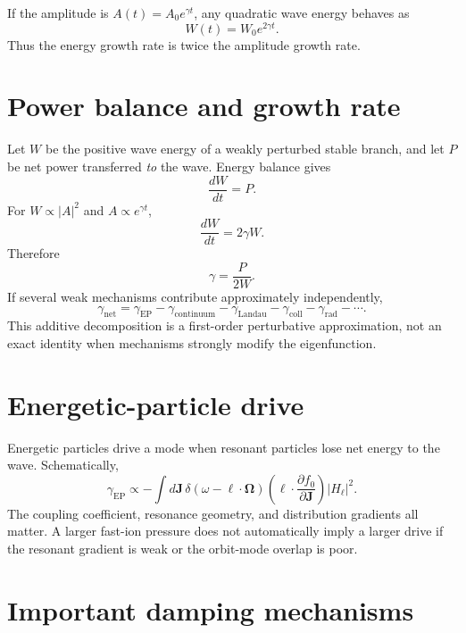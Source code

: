 \documentclass[11pt]{article}
\begin{document}
If the amplitude is $A(t)=A_0e^{\gamma t}$, any quadratic wave energy behaves as
\begin{equation}
W(t)=W_0e^{2\gamma t}.
\end{equation}
Thus the energy growth rate is twice the amplitude growth rate.

\section{Power balance and growth rate}
Let $W$ be the positive wave energy of a weakly perturbed stable branch, and let $P$ be net power transferred \emph{to} the wave. Energy balance gives
\begin{equation}
\frac{dW}{dt}=P.
\end{equation}
For $W\propto |A|^2$ and $A\propto e^{\gamma t}$,
\begin{equation}
\frac{dW}{dt}=2\gamma W.
\end{equation}
Therefore
\begin{equation}
\boxed{\gamma=\frac{P}{2W}}.
\end{equation}
If several weak mechanisms contribute approximately independently,
\begin{equation}
\gamma_{\mathrm{net}}=\gamma_{\mathrm{EP}}-
\gamma_{\mathrm{continuum}}-
\gamma_{\mathrm{Landau}}-
\gamma_{\mathrm{coll}}-
\gamma_{\mathrm{rad}}-\cdots.
\end{equation}
This additive decomposition is a first-order perturbative approximation, not an exact identity when mechanisms strongly modify the eigenfunction.

\section{Energetic-particle drive}
Energetic particles drive a mode when resonant particles lose net energy to the wave. Schematically,
\begin{equation}
\gamma_{\mathrm{EP}}\propto
-\int d\mathbf J\,
\delta(\omega-\boldsymbol\ell\cdot\boldsymbol\Omega)
\left(\boldsymbol\ell\cdot\frac{\partial f_0}{\partial\mathbf J}\right)
|H_{\boldsymbol\ell}|^2.
\end{equation}
The coupling coefficient, resonance geometry, and distribution gradients all matter. A larger fast-ion pressure does not automatically imply a larger drive if the resonant gradient is weak or the orbit-mode overlap is poor.

\section{Important damping mechanisms}
\end{document}
